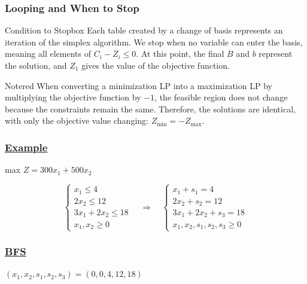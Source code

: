 \subsubsection{Looping and When to Stop}
\begin{prettyBox}{Condition to Stop}{box}
Each table created by a change of basis represents an iteration 
of the simplex algorithm. We stop when no variable can 
enter the basis, meaning all elements of \(C_i - Z_i \leq 0\). 
At this point, the final \(B\) and \(b\) represent the solution, 
and \(Z_1\) gives the value of the objective function.
\end{prettyBox}

\vspace{0.35cm}

\begin{prettyBox}{Note}{red}
When converting a minimization LP into a maximization LP by multiplying the objective function 
by \(-1\), the feasible region does not change because the constraints remain the same. 
Therefore, the solutions are identical, with only the objective value changing: 
\(Z_{\text{min}} = -Z_{\text{max}}\).
\end{prettyBox}

\vspace{0.35cm}

\subsubsection*{\underline{Example}}
max \(Z = 300x_1 + 500x_2\)

\[
\left\{
\begin{array}{l}
    x_{1} \leq 4 \\
    2x_{2} \leq 12 \\
    3x_{1} + 2x_{2} \leq 18 \\
    x_{1}, x_{2}\geq 0
\end{array}
\right.
\quad
\Longrightarrow
\quad
\left\{
\begin{array}{l}
    x_{1} + s_{1} = 4 \\
    2x_{2} + s_{2} = 12 \\
    3x_{1} + 2x_{2} + s_{3} = 18 \\
    x_{1}, x_{2}, s_{1}, s_{2}, s_{3} \geq 0
\end{array}
\right.
\]


\vspace{1.5cm}


\subsubsection*{\underline{BFS}}
\((x_1,x_2,s_1,s_2,s_3) = (0,0,4,12,18)\)

